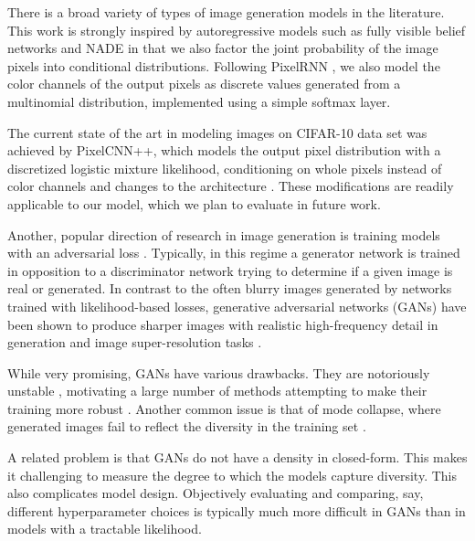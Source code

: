 There is a broad variety of types of image generation models in the literature. This work is strongly inspired by autoregressive models such as fully visible belief networks and NADE \citep{Bengio00, larochelle2011} in that we also factor the joint probability of the image pixels into conditional distributions. Following PixelRNN \citep{PixelRNN}, we also model the color channels of the output pixels as discrete values generated from a multinomial distribution, implemented using a simple softmax layer.

The current state of the art in modeling images on CIFAR-10 data set was achieved by PixelCNN++, which models the output pixel distribution with a discretized logistic mixture likelihood, conditioning on whole pixels instead of color channels and changes to the architecture \citep{PixelCNNpp}. These modifications are readily applicable to our model, which we plan to evaluate in future work.

Another, popular direction of research in image generation is training models with an adversarial loss \citep{gan}. Typically, in this regime a generator network is trained in opposition to a discriminator network trying to determine if a given image is real or generated. In contrast to the often blurry images generated by networks trained with likelihood-based losses, generative adversarial networks (GANs) have been shown to produce sharper images with realistic high-frequency detail in generation and image super-resolution tasks \citep{StackGAN, SRGAN}.

While very promising, GANs have various drawbacks.
They are notoriously unstable \citep{DCGAN}, motivating a large number of methods attempting to make their training more robust \citep{unrolled_gans, began}. Another common issue is that of mode collapse, where generated images fail to reflect the diversity in the training set \citep{unrolled_gans}.

A related problem is that GANs do not have a density in closed-form. This makes it challenging to measure the degree to which the models capture diversity. This also complicates model design. Objectively evaluating and comparing, say, different hyperparameter choices is typically much more difficult in GANs than in models with a tractable likelihood.